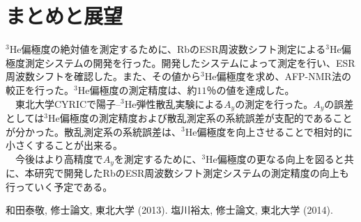 \documentclass[twocolumn,11pt,uplatex]{jsarticle}
\begin{document}
\section{まとめと展望}
$^3$He偏極度の絶対値を測定するために、RbのESR周波数シフト測定による$^3$He偏極度測定システムの開発を行った。開発したシステムによって測定を行い、ESR周波数シフトを確認した。また、その値から$^3$He偏極度を求め、AFP-NMR法の較正を行った。$^3$He偏極度の測定精度は、約$11$％の値を達成した。\\
　東北大学CYRICで陽子--$^3$He弾性散乱実験による$A_y$の測定を行った。$A_y$の誤差としては$^3$He偏極度の測定精度および散乱測定系の系統誤差が支配的であることが分かった。散乱測定系の系統誤差は、$^3$He偏極度を向上させることで相対的に小さくすることが出来る。\\
　今後はより高精度で$A_y$を測定するために、$^3$He偏極度の更なる向上を図ると共に、本研究で開発したRbのESR周波数シフト測定システムの測定精度の向上も行っていく予定である。
 
\begin{thebibliography}{99}

 和田泰敬, 修士論文, 東北大学 (2013).
 塩川裕太, 修士論文, 東北大学 (2014).
 
\end{thebibliography}
\end{document}
